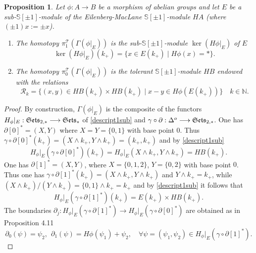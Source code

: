 \documentclass[cupthm]{CUP-JNL-JMJ}
\numberwithin{equation}{section}
\theoremstyle{cupplain}
\newtheorem{proposition}[theorem]{Proposition}
\theoremstyle{cupdefinition}
\theoremstyle{cupremark}
\theoremstyle{cupproof}
\newtheorem{proof}{Proof}
\def\N{{\mathbb N}}
\def\S{{\mathbb S}}
\def\cR{{\mathcal R}}
\def\cT{{\mathcal T}}
\def\sss{{\S}}
\def\spm{{\sss[\pm 1]}}
\def\Se{\frak{ Sets}}
\def\Ses{{\Se_*}}
\def\pik{\pi^{\cT}}
\def\dop{{\Delta^o}}
\def\crel{{\Se_{2,*}}}
\begin{document}
\begin{appendix}
\begin{proposition}\label{proppi0} Let $\phi:A\to B$ be  a morphism of abelian groups and let $E$ be a sub-$\spm$-module of the Eilenberg-MacLane $\spm$-module $HA$ (where $(\pm 1)x:=\pm x$).
\begin{enumerate}
\item[(i)] The homotopy $\pik_1(\Gamma(\phi\vert_E))$ is the sub-$\spm$-module $\ker(H\phi\vert_E)$ of $E$ \begin{equation}\label{kerphi}
 \ker(H\phi\vert_E)(k_+)=\{x\in E(k_+)\mid H\phi(x)=*\}.
  \end{equation} 
\item[(ii)]The homotopy $\pik_0(\Gamma(\phi\vert_E))$ is the tolerant $\spm$-module $HB$ endowed with the relations 
	\begin{equation}\label{relk}
 \cR_k=\{(x,y)\in HB(k_+)\times HB(k_+)\mid x-y\in H\phi(E(k_+))\}\quad k\in\N.
  \end{equation}
  \end{enumerate}
\end{proposition}  
\begin{proof}
    By construction,  $\Gamma(\phi\vert_E)$ is the composite of  the functors $ H_\phi\vert_E:\crel \longrightarrow \Ses $ of \eqref{descript1sub} and $\gamma\circ\partial:\dop \longrightarrow\crel$.  One has $\partial[0]^*=(X,Y)$ where $X=Y=\{0,1\}$ with base point $0$. Thus  $\gamma\circ\partial[0]^*(k_+)=(X\wedge k_+,Y\wedge k_+)=(k_+,k_+)$ and by \eqref{descript1sub}
\[
H_\phi\vert_E(\gamma\circ\partial[0]^*)(k_+)=H_\phi\vert_E(X\wedge k_+,Y\wedge k_+)=HB(k_+).
\]
One has $\partial[1]^*=(X,Y)$, where $X=\{0,1,2\}$, $Y=\{0,2\}$ with base point $0$. Thus one has $\gamma\circ\partial[1]^*(k_+)=(X\wedge k_+,Y\wedge k_+)$ and $Y\wedge k_+=k_+$, while $(X\wedge k_+)/(Y\wedge k_+)=\{0,1\}\wedge k_+=k_+$ and by \eqref{descript1sub} it follows that
        \begin{equation}\label{pideg1}
 H_\phi\vert_E(\gamma\circ\partial[1]^*)(k_+)= E(k_+)\times HB(k_+).
\end{equation}
The boundaries $\partial_j: H_\phi\vert_E(\gamma\circ\partial[1]^*)\to H_\phi\vert_E(\gamma\circ\partial[0]^*)$ are obtained as in \cite{CCAtiyah} Proposition 4.11 
\begin{equation}\label{pi0}
\partial_0(\psi)=\psi_2, \ \ \partial_1(\psi)=H\phi(\psi_1)+\psi_2, \quad \forall \psi=(\psi_1,\psi_2)\in H_\phi\vert_E(\gamma\circ\partial[1]^*).
\end{equation}


\end{proof}
\end{appendix}
\end{document}
